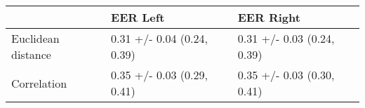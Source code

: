 \begin{tabular}{lll}
\toprule
{} &                    EER Left &                   EER Right \\
\midrule
Euclidean distance &  0.31 +/- 0.04 (0.24, 0.39) &  0.31 +/- 0.03 (0.24, 0.39) \\
Correlation        &  0.35 +/- 0.03 (0.29, 0.41) &  0.35 +/- 0.03 (0.30, 0.41) \\
\bottomrule
\end{tabular}
